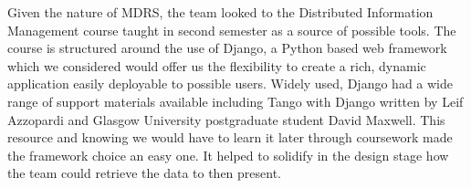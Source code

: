 \documentclass{l3proj}
\begin{document}


Given the nature of MDRS, the team looked to the Distributed Information Management course taught in second semester as a source of possible tools. The course is structured around the use of \gls{Django}, a \gls{Python} based web framework which we considered  would offer us the flexibility to create a rich, dynamic application easily deployable to possible users. Widely used, Django had a wide range of support materials available including Tango with Django written by Leif Azzopardi and Glasgow University postgraduate student David Maxwell. This resource and knowing we would have to learn it later through coursework made the framework choice an easy one. It helped to solidify in the design stage how the team could retrieve the data to then present.
\end{document}
